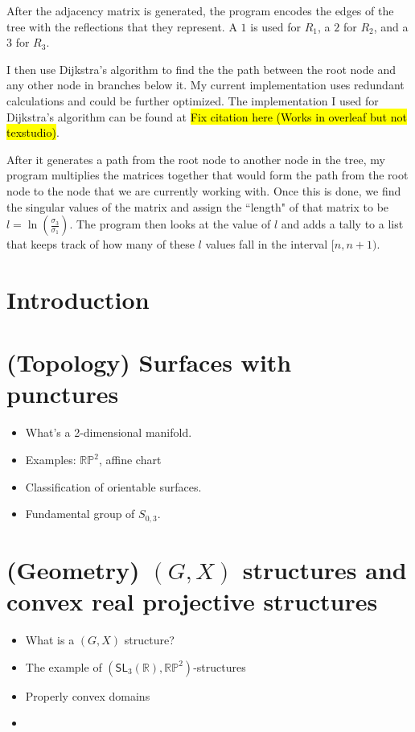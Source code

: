 \documentclass{amsart}
\begin{document}
After the adjacency matrix is generated, the program encodes the edges of the tree with the reflections that they represent. A $1$ is used for $R_1$, a $2$ for $R_2$, and a $3$ for $R_3$. 



I then use Dijkstra's algorithm to find the the path between the root node and any other node in branches below it. My current implementation uses redundant calculations and could be further optimized. The implementation I used for Dijkstra's algorithm can be found at \hl{Fix citation here (Works in overleaf but not texstudio)}\cite{alexey_dijkstra_alg}.


 After it generates a path from the root node to another node in the tree, my program multiplies the matrices together that would form the path from the root node to the node that we are currently working with. Once this is done, we find the singular values of the matrix and assign the ``length" of that matrix to be $l = \ln\left(\frac{\sigma_3}{\sigma_1}\right)$. The program then looks at the value of $l$ and adds a tally to a list that keeps track of how many of these $l$ values fall in the interval $[n, n+1)$.
 
 

\newpage
\section{Introduction}
\section{(Topology) Surfaces with punctures}
\begin{itemize}
    \item What's a 2-dimensional manifold.
    \item Examples: $\mathbb {RP}^2$, affine chart 
    \item Classification of orientable surfaces.
    \item Fundamental group of $S_{0,3}$.
\end{itemize}
\section{(Geometry) $(G,X)$ structures and convex real projective structures}
\begin{itemize}
    \item What is a $(G,X)$ structure?
    \item The example of $(\mathsf{SL}_3(\mathbb R),\mathbb{RP}^2)$-structures
    \item Properly convex domains
    \item 
\end{itemize}
\end{document}
